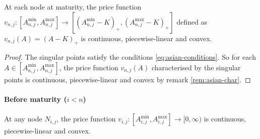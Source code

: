 \begin{lmm}
	\label{lmm:asian-pr-maturity}
	At each node at maturity, the price function $ { v_{n,j}: \left[ A_{n,j}^{\min}, A_{n,j}^{\max} \right] \to \left[ ( A_{n,j}^{\min} - K )_+ , ( A_{n,j}^{\max} - K )_+ \right] } $ defined as $ v_{n,j}(A) = (A - K)_+ $ is continuous, piecewise-linear and convex.
\end{lmm}
\begin{proof}
	The singular points satisfy the conditions \ref{eq:asian-conditions}. So for each $ A \in \left[ A_{n,j}^{\min}, A_{n,j}^{\max} \right] $, the price function ${ v_{n,j}(A) }$ characterised by the singular points is continuous, piecewise-linear and convex by remark \ref{rem:asian-char}.
\end{proof}



\paragraph{Before maturity ($ i < n $)}

\begin{lmm}
	\label{lmm:asian-dsc-expt}
	At any node $ N_{i,j} $, the price function $ v_{i,j}: \left[ A_{i,j}^{\min}, A_{i,j}^{\max} \right] \to [0, \infty) $ is continuous, piecewise-linear and convex.
\end{lmm}

